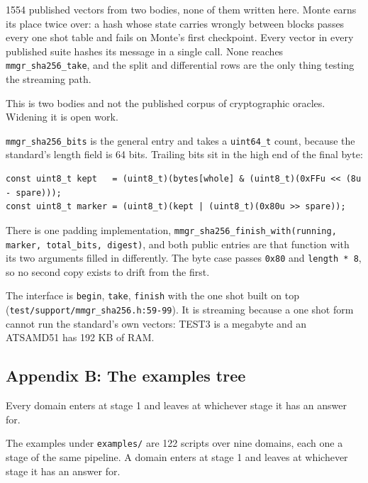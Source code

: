 1554 published vectors from two bodies, none of them written here. Monte earns its place twice over: a hash whose state carries wrongly between blocks passes every one shot table and fails on Monte's first checkpoint. Every vector in every published suite hashes its message in a single call. None reaches \texttt{mmgr\_\allowbreak{}sha256\_\allowbreak{}take}, and the split and differential rows are the only thing testing the streaming path.

This is two bodies and not the published corpus of cryptographic oracles. Widening it is open work.

\texttt{mmgr\_\allowbreak{}sha256\_\allowbreak{}bits} is the general entry and takes a \texttt{uint64\_\allowbreak{}t} count, because the standard's length field is 64 bits. Trailing bits sit in the high end of the final byte:

\begin{lstlisting}[breaklines=true,breakatwhitespace=false,basicstyle=\ttfamily\small]
const uint8_t kept   = (uint8_t)(bytes[whole] & (uint8_t)(0xFFu << (8u - spare)));
const uint8_t marker = (uint8_t)(kept | (uint8_t)(0x80u >> spare));
\end{lstlisting}

There is one padding implementation, \texttt{mmgr\_\allowbreak{}sha256\_\allowbreak{}finish\_\allowbreak{}with(running, marker, total\_\allowbreak{}bits, digest)}, and both public entries are that function with its two arguments filled in differently. The byte case passes \texttt{0x80} and \texttt{length * 8}, so no second copy exists to drift from the first.

The interface is \texttt{begin}, \texttt{take}, \texttt{finish} with the one shot built on top (\texttt{test/\allowbreak{}support/\allowbreak{}mmgr\_\allowbreak{}sha256.\allowbreak{}h:59-\allowbreak{}99}). It is streaming because a one shot form cannot run the standard's own vectors: TEST3 is a megabyte and an ATSAMD51 has 192 KB of RAM.

\subsection{Appendix B: The examples tree}

Every domain enters at stage 1 and leaves at whichever stage it has an answer for.

The examples under \texttt{examples/\allowbreak{}} are 122 scripts over nine domains, each one a
stage of the same pipeline. A domain enters at stage 1 and leaves at whichever stage it has an
answer for.

